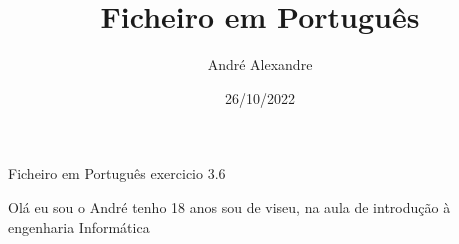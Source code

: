 \documentclass[11pt,openright,twoside]{report}
\title{\textbf{Ficheiro em Português}}
\author{André Alexandre}
\date{26/10/2022}
\begin{document}
\maketitle
Ficheiro em Português exercicio 3.6

Olá eu sou o André tenho 18 anos sou de viseu, na aula de introdução à engenharia Informática
\end{document}
